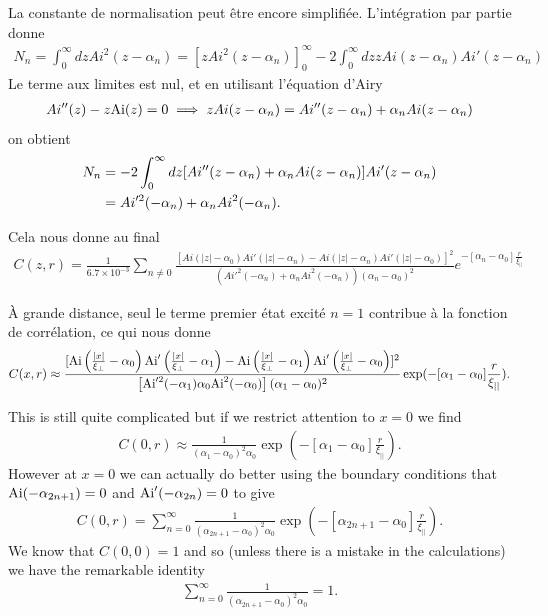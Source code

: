 La constante de normalisation peut être encore simplifiée. L'intégration par partie donne
\begin{align}
	N_n = \int_0^\infty dz Ai^2 (z -\alpha_n) = [z Ai^2 (z -\alpha_n)]_0^\infty - 2\int_0^\infty dz  z Ai(z -\alpha_n)Ai'(z -\alpha_n)
\end{align}
Le terme aux limites est nul, et en utilisant l'équation d'Airy 
\begin{align}
	Ai''(z) -z{\rm Ai}(z)=0 \implies z Ai(z-\alpha_n) = Ai''(z-\alpha_n) + \alpha_n Ai(z-\alpha_n)
\end{align}
on obtient
\begin{align}
	N_n &= -2\int_0^\infty dz [Ai''(z -\alpha_n)+\alpha_n Ai(z -\alpha_n)] Ai'(z -\alpha_n)  \nonumber \\
	&= Ai'^2(-\alpha_n) + \alpha_n Ai^2(-\alpha_n).
\end{align}

Cela nous donne au final
\begin{align}
	C(z,r) = \frac{1}{6.7 \times 10^{-3}}\sum_{n\neq 0} \frac{\left[ Ai(|z|-\alpha_0)Ai'(|z|-\alpha_n) -Ai(|z|-\alpha_n)Ai'(|z|-\alpha_0) \right]^2}
{(Ai'^2(-\alpha_n) + \alpha_n Ai^2(-\alpha_n))  (\alpha_n-\alpha_0)^2}e^{-[\alpha_n-\alpha_0] \frac{r}{\xi_{||}}}
\end{align}

À grande distance, seul le terme premier état excité $n=1$ contribue à la fonction de corrélation, ce qui nous donne
\begin{align}
C(x,r) \approx \frac{[{\rm Ai}\left(\frac{|x|}{\xi_{\perp}} -\alpha_{0}\right){\rm Ai}'\left( \frac{|x|}{\xi_{\perp}}-\alpha_{1}\right)-{\rm Ai}\left(\frac{|x|}{\xi_{\perp}} -\alpha_{1}\right){\rm Ai}'\left(\frac{|x|}{\xi_{\perp}} -\alpha_{0}\right)]^2}{\left[ {\rm Ai}'^2(-\alpha_{1}) \alpha_0 {\rm Ai}^2(-\alpha_0)\right](\alpha_1-\alpha_0)^2}\exp(-[\alpha_1-\alpha_0] \frac{r}{\xi_{||}}).
\end{align}

This is still quite complicated but if we restrict attention to $x=0$ we find
\begin{align}
C(0,r) \approx \frac{1}{(\alpha_1-\alpha_0)^2\alpha_0}\exp(-[\alpha_1-\alpha_0] \frac{r}{\xi_{||}}).
\end{align}
However at $x=0$ we can actually do better using the boundary conditions
that ${\rm Ai}(-\alpha_{2n+1}) =0$ and ${\rm Ai}'(-\alpha_{2n}) =0$ to give
\begin{align}
C(0,r) = \sum_{n=0}^\infty \frac{1}{(\alpha_{2n+1}-\alpha_0)^2\alpha_0}\exp(-[\alpha_{2n+1}-\alpha_0] \frac{r}{\xi_{||}}).%
\end{align}
We know that $C(0,0)=1$ and so (unless there is a mistake in the calculations) we have the remarkable identity
\begin{align}
\sum_{n=0}^\infty \frac{1}{(\alpha_{2n+1}-\alpha_0)^2\alpha_0} = 1.
\end{align}

